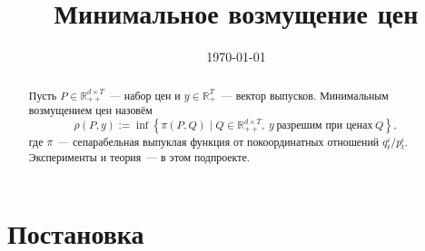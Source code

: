 \documentclass[a4paper,11pt]{article}
\title{Минимальное возмущение цен}
\author{}
\date{\today}
\theoremstyle{plain}
\theoremstyle{definition}
\theoremstyle{remark}
\newcommand{\R}{\mathbb{R}}
\newcommand{\set}[1]{\left\{ #1 \right\}}
\newcommand{\Rpp}[1][2]{\R^{#1}_{++}}
\newcommand{\Rp}[1][2]{\R^{#1}_{+}}
\begin{document}
\maketitle

\begin{abstract}
Пусть $P\in\Rpp[d\times T]$~--- набор цен и $y\in\Rp[T]$~--- вектор выпусков. Минимальным возмущением цен назовём
\[
    \rho(P,y):=\inf\set{\pi(P,Q)\mid Q\in\Rpp[d\times T],\ y\ \text{разрешим при ценах}\ Q},
\]
где $\pi$~--- сепарабельная выпуклая функция от покоординатных отношений $q^i_t/p^i_t$. Эксперименты и теория~--- в этом подпроекте.
\end{abstract}

\section{Постановка}

\end{document}
